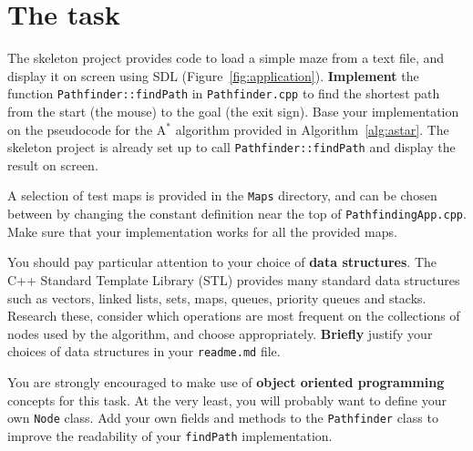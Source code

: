 \documentclass{scrartcl}
\begin{document}
\clearpage

\section*{The task}

The skeleton project provides code to load a simple maze from a text file, and display it on screen using SDL
(Figure~\ref{fig:application}).
\textbf{Implement} the function \lstinline!Pathfinder::findPath! in \texttt{Pathfinder.cpp}
to find the shortest path from the start (the mouse) to the goal (the exit sign).
Base your implementation on the pseudocode for the A$^*$ algorithm provided in Algorithm~\ref{alg:astar}.
The skeleton project is already set up to call \lstinline!Pathfinder::findPath! and display the result on screen.

A selection of test maps is provided in the \texttt{Maps} directory,
and can be chosen between by changing the constant definition near the top of \texttt{PathfindingApp.cpp}.
Make sure that your implementation works for all the provided maps.

You should pay particular attention to your choice of \textbf{data structures}.
The C++ Standard Template Library (STL) provides many standard data structures such as
vectors, linked lists, sets, maps, queues, priority queues and stacks.
Research these, consider which operations are most frequent on the collections of nodes used by the algorithm,
and choose appropriately.
\textbf{Briefly} justify your choices of data structures in your \texttt{readme.md} file.

You are strongly encouraged to make use of \textbf{object oriented programming} concepts for this task.
At the very least, you will probably want to define your own \lstinline!Node! class.
Add your own fields and methods to the \lstinline!Pathfinder! class
to improve the readability of your \lstinline!findPath! implementation.
\end{document}
